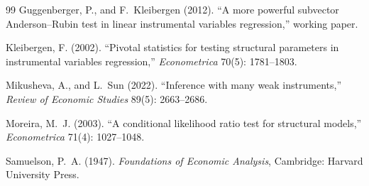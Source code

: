 \documentclass{article}
\theoremstyle{plain}
\theoremstyle{definition}
\theoremstyle{remark}
\begin{document}
\begin{thebibliography}{99}
Guggenberger, P., and F.~Kleibergen (2012).
``A more powerful subvector Anderson--Rubin test in linear instrumental
variables regression,''
working paper.

Kleibergen, F. (2002).
``Pivotal statistics for testing structural parameters in instrumental
variables regression,''
\emph{Econometrica} 70(5): 1781--1803.

Mikusheva, A., and L.~Sun (2022).
``Inference with many weak instruments,''
\emph{Review of Economic Studies} 89(5): 2663--2686.

Moreira, M.~J. (2003).
``A conditional likelihood ratio test for structural models,''
\emph{Econometrica} 71(4): 1027--1048.

Samuelson, P.~A. (1947).
\emph{Foundations of Economic Analysis}, Cambridge: Harvard University Press.

\end{thebibliography}
\end{document}
